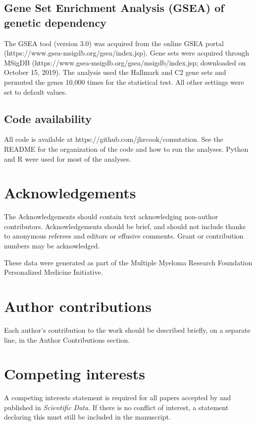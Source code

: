 \documentclass[english, 10pt, letterpaper]{article}
\begin{document}
\subsection*{Gene Set Enrichment Analysis (GSEA) of genetic dependency}
The GSEA tool (version 3.0) was acquired from the online GSEA portal (https://www.gsea-msigdb.org/gsea/index.jsp).
Gene sets were acquired through MSigDB (https://www.gsea-msigdb.org/gsea/msigdb/index.jsp; downloaded on October 15, 2019).
The analysis used the Hallmark and C2 gene sets and permuted the genes 10,000 times for the statistical test.
All other settings were set to default values.


\subsection*{Code availability}

All code is available at https://github.com/jhrcook/comutation.
See the README for the organization of the code and how to run the analyses.
Python \cite{van1995python} and R \cite{Rlang} were used for most of the analyses.



\section*{Acknowledgements}

The Acknowledgements should contain text acknowledging non-author contributors.
Acknowledgements should be brief, and should not include thanks to anonymous referees and editors or effusive comments.
Grant or contribution numbers may be acknowledged.

These data were generated as part of the Multiple Myeloma Research Foundation Personalized Medicine Initiative.

\section*{Author contributions}

Each author’s contribution to the work should be described briefly, on a separate line, in the Author Contributions section. 

\section*{Competing interests}

A competing interests statement is required for all papers accepted by and published in \emph{Scientific Data}. If there is no conflict of interest, a statement declaring this must still be included in the manuscript.
\end{document}
